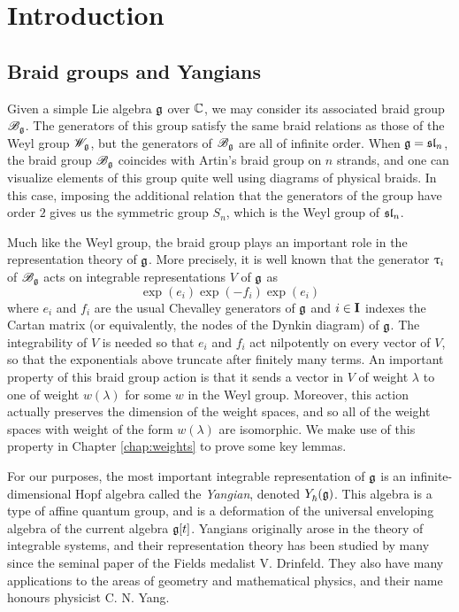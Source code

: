 \chapter{Introduction}

\section{Braid groups and Yangians}

Given a simple Lie algebra $\mathfrak{g}$ over $\mathbb{C}$, we may consider its associated braid group $\mathscr{B}_{\mathfrak{g}}$.
The generators of this group satisfy the same braid relations as those of the Weyl group $\mathscr{W}_{\mathfrak{g}}$, but the generators of $\mathscr{B}_{\mathfrak{g}}$ are all of infinite order.
When $\mathfrak{g} = \mathfrak{sl}_n$, the braid group $\mathscr{B}_{\mathfrak{g}}$ coincides with Artin's braid group on $n$ strands, and one can visualize elements of this group quite well using diagrams of physical braids.
In this case, imposing the additional relation that the generators of the group have order $2$ gives us the symmetric group $S_n$, which is the Weyl group of $\mathfrak{sl}_n$.

Much like the Weyl group, the braid group plays an important role in the representation theory of $\mathfrak{g}$.
More precisely, it is well known that the generator $\uptau_i$ of $\mathscr{B}_{\mathfrak{g}}$ acts on integrable representations $V$ of $\mathfrak{g}$ as
\[\exp(e_i)\exp(-f_i)\exp(e_i)\]
where $e_i$ and $f_i$ are the usual Chevalley generators of $\mathfrak{g}$ and $i\in\mathbf{I}$ indexes the Cartan matrix (or equivalently, the nodes of the Dynkin diagram) of $\mathfrak{g}$.
The integrability of $V$ is needed so that $e_i$ and $f_i$ act nilpotently on every vector of $V$, so that the exponentials above truncate after finitely many terms.
An important property of this braid group action is that it sends a vector in $V$ of weight $\lambda$ to one of weight $w(\lambda)$ for some $w$ in the Weyl group.
Moreover, this action actually preserves the dimension of the weight spaces, and so all of the weight spaces with weight of the form $w(\lambda)$ are isomorphic.
We make use of this property in Chapter \ref{chap:weights} to prove some key lemmas.

For our purposes, the most important integrable representation of $\mathfrak{g}$ is an infinite-dimensional Hopf algebra called the \emph{Yangian}, denoted $Y_\hbar^{}(\mathfrak{g})$.
This algebra is a type of affine quantum group, and is a deformation of the universal enveloping algebra of the current algebra $\mathfrak{g}[t]$.
Yangians originally arose in the theory of integrable systems, and their representation theory has been studied by many since the seminal paper \cite{drinfeld_hopf_1985} of the Fields medalist V. Drinfeld.
They also have many applications to the areas of geometry and mathematical physics, and their name honours physicist C. N. Yang.

